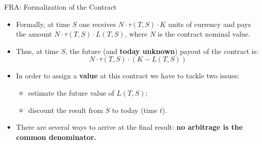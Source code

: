 \documentclass{beamer}
\begin{document}
\begin{frame}{FRA: Formalization of the Contract}
	\begin{itemize}
		\item<1-> Formally, at time $S$ one receives $N\cdot\tau(T, S)\cdot K$ units of currency and pays the amount $N\cdot\tau(T,S)\cdot L(T,S)$, where $N$ is the contract nominal value.
		\item<2-> Thus, at time $S$, the future (and \textbf{today unknown}) payout of the contract is:
		\begin{equation}
			N\cdot\tau(T,S)\cdot(K-L(T,S))
			\label{eq:fra_payoff}
		\end{equation}
		\item<3-> In order to assign a \textbf{value} at this contract we have to tackle two issues:
		\begin{itemize}
			\item<3-> estimate the future value of $L(T, S)$;
			\item<3-> discount the result from $S$ to today (time $t$).
		\end{itemize}
		\item<4-> There are several ways to arrive at the final result: \textbf{no arbitrage is the common denominator.}
%
%
%
%
%
	\end{itemize}
\end{frame}
\end{document}
